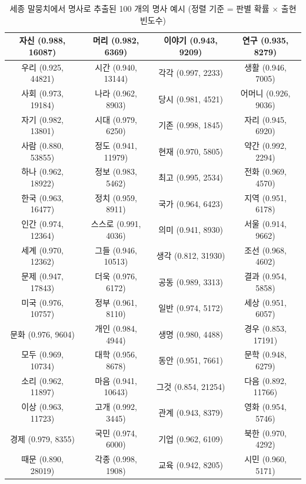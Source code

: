 \documentclass[11pt]{article}
\begin{document}
\begin{table}[H]
  \centering
  \caption{세종 말뭉치에서 명사로 추출된 100 개의 명사 예시 (정렬 기준 = 판별 확률 $\times$ 출현 빈도수)}
  \label{tab:sejong_frequent_top100}
    \begin{tabular}{|c|c|c|c|}
\hline
자신 (0.988, 16087)  & 머리 (0.982, 6369)  & 이야기 (0.943, 9209) & 연구 (0.935, 8279)  \\ \hline
우리 (0.925, 44821)  & 시간 (0.940, 13144) & 각각 (0.997, 2233)  & 생활 (0.946, 7005)  \\ \hline
사회 (0.973, 19184)  & 나라 (0.962, 8903)  & 당시 (0.981, 4521)  & 어머니 (0.926, 9036) \\ \hline
자기 (0.982, 13801)  & 시대 (0.979, 6250)  & 기존 (0.998, 1845)  & 자리 (0.945, 6920)  \\ \hline
사람 (0.880, 53855)  & 정도 (0.941, 11979) & 현재 (0.970, 5805)  & 약간 (0.992, 2294)  \\ \hline
하나 (0.962, 18922)  & 정보 (0.983, 5462)  & 최고 (0.995, 2534)  & 전화 (0.969, 4570)  \\ \hline
한국 (0.963, 16477)  & 정치 (0.959, 8911)  & 국가 (0.964, 6423)  & 지역 (0.951, 6178)  \\ \hline
인간 (0.974, 12364)  & 스스로 (0.991, 4036) & 의미 (0.941, 8930)  & 서울 (0.914, 9662)  \\ \hline
세계 (0.970, 12362)  & 그들 (0.946, 10513) & 생각 (0.812, 31930) & 조선 (0.968, 4602)  \\ \hline
문제 (0.947, 17843)  & 더욱 (0.976, 6172)  & 공동 (0.989, 3313)  & 결과 (0.954, 5858)  \\ \hline
미국 (0.976, 10757)  & 정부 (0.961, 8110)  & 일반 (0.974, 5172)  & 세상 (0.951, 6057)  \\ \hline
문화 (0.976, 9604)   & 개인 (0.984, 4944)  & 생명 (0.980, 4488)  & 경우 (0.853, 17191) \\ \hline
모두 (0.969, 10734)  & 대학 (0.956, 8678)  & 동안 (0.951, 7661)  & 문학 (0.948, 6279)  \\ \hline
소리 (0.962, 11897)  & 마음 (0.941, 10643) & 그것 (0.854, 21254) & 다음 (0.892, 11766) \\ \hline
이상 (0.963, 11723)  & 고개 (0.992, 3445)  & 관계 (0.943, 8379)  & 영화 (0.954, 5746)  \\ \hline
경제 (0.979, 8355)   & 국민 (0.974, 6000)  & 기업 (0.962, 6109)  & 북한 (0.970, 4292)  \\ \hline
때문 (0.890, 28019)  & 각종 (0.998, 1908)  & 교육 (0.942, 8205)  & 시민 (0.960, 5171)  \\ \hline

\end{tabular}
\end{table}
\end{document}
